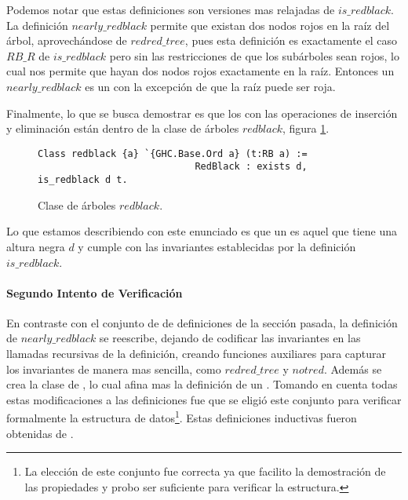 Podemos notar que estas definiciones son versiones mas relajadas de $is\_redblack$. La
definici\'on $nearly\_redblack$ permite que existan dos nodos rojos en la ra\'iz del \'arbol,
aprovech\'andose de $redred\_tree$, pues esta definici\'on es exactamente el caso $RB\_R$ de
$is\_redblack$ pero sin las restricciones de que los sub\'arboles sean rojos, lo cual nos permite
que hayan dos nodos rojos exactamente en la ra\'iz. Entonces un $nearly\_redblack$ es un {\arn} con
la excepci\'on de que la ra\'iz puede ser roja.

Finalmente, lo que se busca demostrar es que los {\arns} con las operaciones de inserci\'on y
eliminaci\'on están dentro de la clase de \'arboles $redblack$, figura \ref{class_rb}.

\begin{figure}
\centering
\captionsetup{justification=centering}
\begin{verbatim}
Class redblack {a} `{GHC.Base.Ord a} (t:RB a) :=
                            RedBlack : exists d, is_redblack d t.
\end{verbatim}
\caption{Clase de \'arboles $redblack$.}
\label{class_rb}
\end{figure}

Lo que estamos describiendo con este enunciado es que un {\arn} es aquel que tiene una altura
negra $d$ y cumple con las invariantes establecidas por la definici\'on $is\_redblack$.

\paragraph{Segundo Intento de Verificaci\'on}
En contraste con el conjunto de de definiciones de la secci\'on pasada, la definici\'on de
$nearly\_redblack$ se reescribe, dejando de codificar las invariantes en las llamadas recursivas
de la definición, creando funciones auxiliares para capturar los invariantes de manera mas
sencilla, como $redred\_tree$ y $notred$. Además se crea la clase de {\arns}, lo cual afina mas la
definici\'on de un {\arn}. Tomando en cuenta todas estas modificaciones a las definiciones fue que
se eligió este conjunto para verificar formalmente la estructura de datos\footnote{La elecci\'on
de este conjunto fue correcta ya que facilito la demostraci\'on de las propiedades y probo ser
suficiente para verificar la estructura.}.
Estas definiciones inductivas fueron obtenidas de \cite{MSetRBT}.

